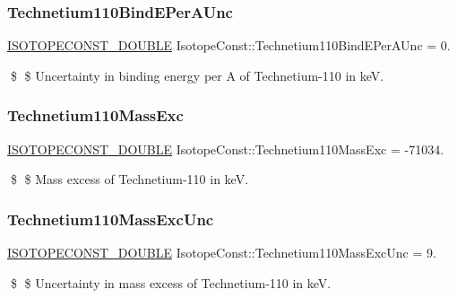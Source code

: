\subsubsection{\texorpdfstring{Technetium110\+Bind\+E\+Per\+A\+Unc}{Technetium110BindEPerAUnc}}
{\footnotesize\ttfamily \mbox{\hyperlink{group___isotope_const-_macros_ga8f45a7272ce02c0b4c65c44636ed719a}{I\+S\+O\+T\+O\+P\+E\+C\+O\+N\+S\+T\+\_\+\+D\+O\+U\+B\+LE}} Isotope\+Const\+::\+Technetium110\+Bind\+E\+Per\+A\+Unc = 0.}

\$ \$ Uncertainty in binding energy per A of Technetium-\/110 in keV. \mbox{\label{group___isotope_const-_technetium-_tc110_ga88f9d6eac6678170f3944e8edd359d17}} 
\subsubsection{\texorpdfstring{Technetium110\+Mass\+Exc}{Technetium110MassExc}}
{\footnotesize\ttfamily \mbox{\hyperlink{group___isotope_const-_macros_ga8f45a7272ce02c0b4c65c44636ed719a}{I\+S\+O\+T\+O\+P\+E\+C\+O\+N\+S\+T\+\_\+\+D\+O\+U\+B\+LE}} Isotope\+Const\+::\+Technetium110\+Mass\+Exc = -\/71034.}

\$ \$ Mass excess of Technetium-\/110 in keV. \mbox{\label{group___isotope_const-_technetium-_tc110_ga17330cf34c0cb2adec5dbb8d467206f0}} 
\subsubsection{\texorpdfstring{Technetium110\+Mass\+Exc\+Unc}{Technetium110MassExcUnc}}
{\footnotesize\ttfamily \mbox{\hyperlink{group___isotope_const-_macros_ga8f45a7272ce02c0b4c65c44636ed719a}{I\+S\+O\+T\+O\+P\+E\+C\+O\+N\+S\+T\+\_\+\+D\+O\+U\+B\+LE}} Isotope\+Const\+::\+Technetium110\+Mass\+Exc\+Unc = 9.}

\$ \$ Uncertainty in mass excess of Technetium-\/110 in keV. \mbox{\label{group___isotope_const-_technetium-_tc110_gae9afd921b5a06b902cc144e697ade46e}} 
